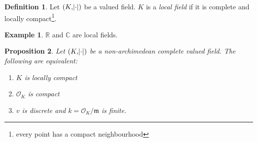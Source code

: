 \documentclass[11pt]{article}
\theoremstyle{definition}
\newtheorem{definition}{Definition}[subsection]
\newtheorem*{example}{Example}
\theoremstyle{plain}
\newtheorem{proposition}[definition]{Proposition}
\theoremstyle{remark}
\newcommand{\bR}{\mathbb{R}}
\newcommand{\bC}{\mathbb{C}}
\newcommand{\cO}{\mathcal{O}}
\newcommand{\fm}{\mathfrak{m}}
\begin{document}
\begin{definition}
    Let $(K, \abs{\cdot})$ be a valued field. $K$ is a \emph{local field} if it is complete and locally compact\footnote{every point has a compact neighbourhood}.
\end{definition}

\begin{example}
    $\bR$ and $\bC$ are local fields.
\end{example}

\begin{proposition}\label{prop:7_2}
    Let $(K, \abs{\cdot})$ be a non-archimedean complete valued field. The following are equivalent:
    \begin{enumerate}
        \item $K$ is locally compact
        \item $\cO_K$ is compact
        \item $v$ is discrete and $k = \cO_K / \fm$ is finite.
    \end{enumerate}
\end{proposition}
\end{document}
